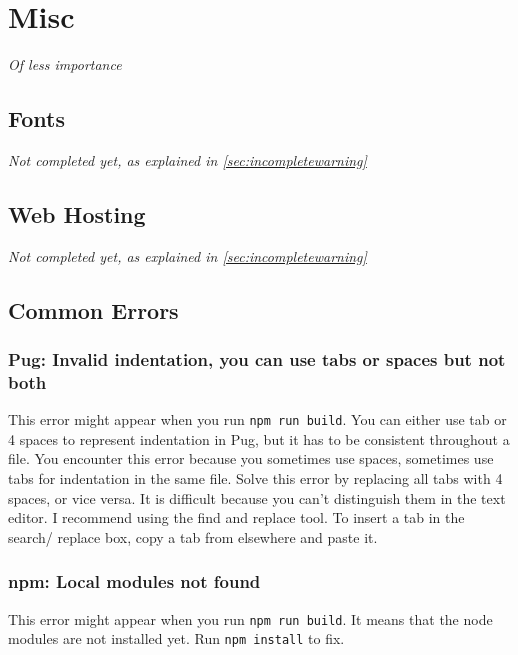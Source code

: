 \chapter{Misc}
\label{sec:misc}

\textit{Of less importance}
\vspace{6mm}

\section{Fonts}
\label{sec:fonts}

\textit{Not completed yet, as explained in \cref{sec:incompletewarning}}

\section{Web Hosting}
\label{sec:webhosting}

\textit{Not completed yet, as explained in \cref{sec:incompletewarning}}

\section{Common Errors}

\subsection{Pug: Invalid indentation, you can use tabs or spaces but not both}

This error might appear when you run \texttt{npm run build}.
You can either use tab or 4 spaces to represent indentation in Pug, but it has to be consistent throughout a file. You encounter this error because you sometimes use spaces, sometimes use tabs for indentation in the same file. Solve this error by replacing all tabs with 4 spaces, or vice versa. It is difficult because you can't distinguish them in the text editor. I recommend using the find and replace tool. To insert a tab in the search/ replace box, copy a tab from elsewhere and paste it.

\subsection{npm: Local modules not found}

This error might appear when you run \texttt{npm run build}. It means that the node modules are not installed yet. Run \texttt{npm install} to fix. 

